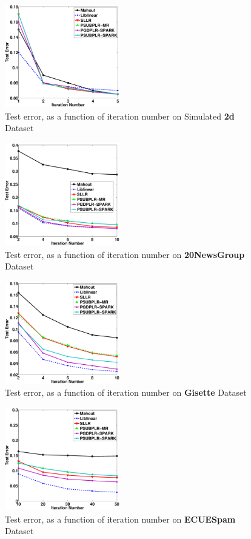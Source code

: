 \documentclass[10pt, conference, compsocconf]{IEEEtran}
\begin{document}
\begin{figure}[tb] \label{fig:03}
\center \includegraphics[height=4.5cm,width=5cm]{img/2d_accuracy_iteration.eps}
\caption{Test error, as a function of iteration number on Simulated \textbf{2d} Dataset}
\end{figure}

\begin{figure}[tb] \label{fig:04}
\center \includegraphics[height=4.5cm,width=5cm]{img/20NewsGroup_accuracy_iteration.eps}
\caption{Test error, as a function of iteration number on \textbf{20NewsGroup} Dataset}
\end{figure}

\begin{figure}[tb] \label{fig:05}
\center \includegraphics[height=4.5cm,width=5cm]{img/Gisette_accuracy_iteration.eps}
\caption{Test error, as a function of iteration number on \textbf{Gisette} Dataset}
\end{figure}

\begin{figure}[tb] \label{fig:06}
\center \includegraphics[height=4.5cm,width=5cm]{img/ECUESpam_accuracy_iteration.eps}
\caption{Test error, as a function of iteration number on \textbf{ECUESpam} Dataset}
\end{figure}
\end{document}
